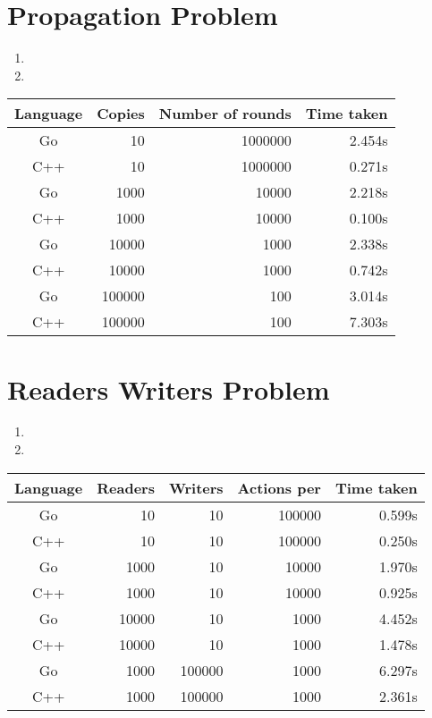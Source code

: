 \documentclass[11pt]{article}
\begin{document}
\section{Propagation Problem}
\begin{enumerate}
	\item
	\item
\end{enumerate}

\begin{tabular}{c r r r}
Language    & Copies & Number of rounds & Time taken \\
\toprule
Go 			& 10 & 1000000 & 2.454s \\
C++         & 10 & 1000000 & 0.271s \\
\cmidrule{1-4}
Go 			& 1000 & 10000 & 2.218s \\
C++         & 1000 & 10000 & 0.100s \\
\cmidrule{1-4}
Go 			& 10000 & 1000 & 2.338s \\
C++         & 10000 & 1000 & 0.742s \\
\cmidrule{1-4}
Go 			& 100000 & 100 & 3.014s \\
C++         & 100000 & 100 & 7.303s \\
\end{tabular}

\section{Readers Writers Problem}
\begin{enumerate}
	\item
	\item
\end{enumerate}

\begin{tabular}{c r r r r}
Language    & Readers & Writers & Actions per & Time taken \\
\toprule
Go 			& 10 & 10 & 100000 & 0.599s \\
C++         & 10 & 10 & 100000 & 0.250s \\
\cmidrule{1-5}
Go 			& 1000 & 10 & 10000 & 1.970s \\
C++         & 1000 & 10 & 10000 & 0.925s \\
\cmidrule{1-5}
Go 			& 10000 & 10 & 1000 & 4.452s \\
C++         & 10000 & 10 & 1000 & 1.478s \\
\cmidrule{1-5}
Go 			& 1000 & 100000 & 1000 & 6.297s \\
C++         & 1000 & 100000 & 1000 & 2.361s \\
\end{tabular}
\end{document}
